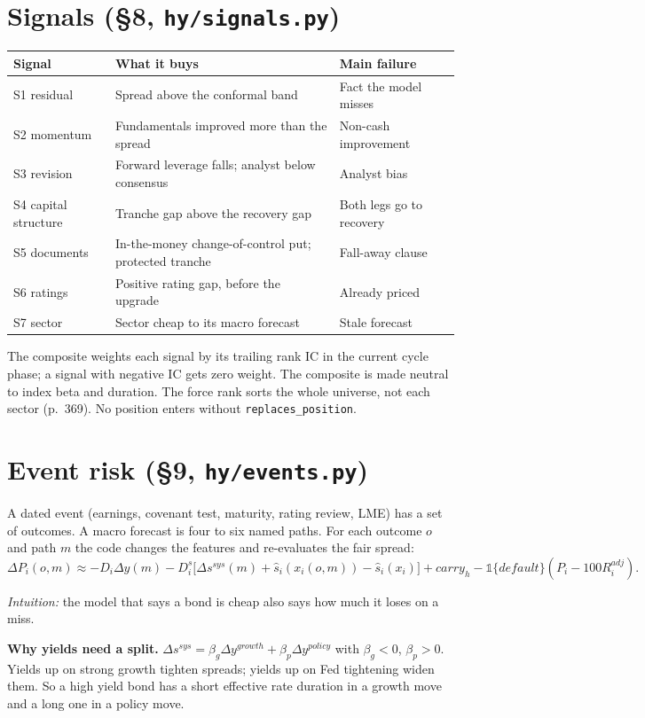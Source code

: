 \documentclass[11pt,a4paper]{article}
\newcommand{\code}[1]{\texttt{\small #1}}
\newcommand{\why}[1]{\par\noindent\textcolor{teal!60!black}{\textit{Intuition:} #1}\par}
\begin{document}
\section{Signals (\S8, \code{hy/signals.py})}
\label{sec:signals}
\begin{tabularx}{\linewidth}{@{}lXl@{}}\toprule
Signal & What it buys & Main failure \\\midrule
S1 residual & Spread above the conformal band & Fact the model misses \\
S2 momentum & Fundamentals improved more than the spread & Non-cash improvement \\
S3 revision & Forward leverage falls; analyst below consensus & Analyst bias \\
S4 capital structure & Tranche gap above the recovery gap & Both legs go to recovery \\
S5 documents & In-the-money change-of-control put; protected tranche & Fall-away clause \\
S6 ratings & Positive rating gap, before the upgrade & Already priced \\
S7 sector & Sector cheap to its macro forecast & Stale forecast \\\bottomrule
\end{tabularx}

\medskip
The composite weights each signal by its trailing rank IC in the current cycle phase; a signal with negative IC gets zero weight. The composite is made neutral to index beta and duration. The force rank sorts the whole universe, not each sector (p.~369). No position enters without \code{replaces\_position}.

\section{Event risk (\S9, \code{hy/events.py})}
\label{sec:events}
A dated event (earnings, covenant test, maturity, rating review, LME) has a set of outcomes. A macro forecast is four to six named paths. For each outcome $o$ and path $m$ the code changes the features and re-evaluates the fair spread:
\[ \Delta P_i(o,m)\approx-D_i\Delta y(m)-D^s_i\big[\Delta s^{sys}(m)+\hat s_i(x_i(o,m))-\hat s_i(x_i)\big]+carry_h-\mathbb 1\{default\}(P_i-100R^{adj}_i). \]
\why{the model that says a bond is cheap also says how much it loses on a miss.}

\textbf{Why yields need a split.} $\Delta s^{sys}=\beta_g\Delta y^{growth}+\beta_p\Delta y^{policy}$ with $\beta_g<0$, $\beta_p>0$. Yields up on strong growth tighten spreads; yields up on Fed tightening widen them. So a high yield bond has a short effective rate duration in a growth move and a long one in a policy move.
\end{document}
